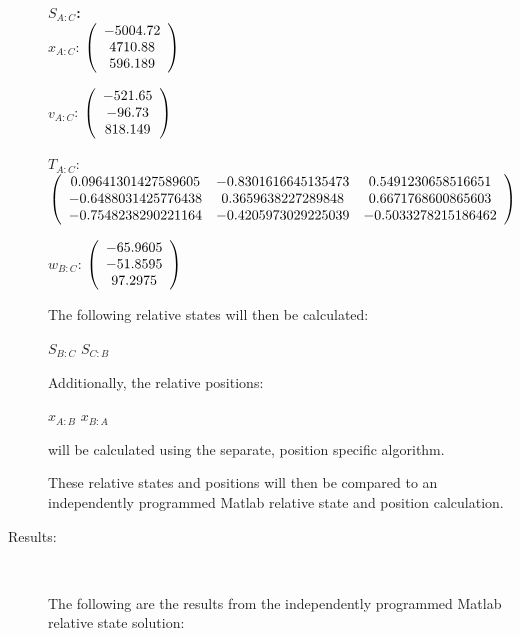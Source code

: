 \begin{description}
\Large{\textbf{$S_{A:C}$:}} \normalsize \\

$x_{A:C}$: $\left( \begin{array} {ccc}  -5004.72 \\    4710.88 \\    596.189
\end{array} \right)\\ \\$

$v_{A:C}$:  $\left( \begin{array} {ccc}  -521.65 \\     -96.73 \\    818.149
\end{array} \right)\\ \\$

$T_{A:C}$: $\left( \begin{array} {ccc}
0.09641301427589605 & -0.8301616645135473 & 0.5491230658516651 \\
-0.6488031425776438 & 0.3659638227289848 & 0.6671768600865603 \\
 -0.7548238290221164 & -0.4205973029225039 & -0.5033278215186462
\end{array} \right)\\ \\$

$w_{B:C}$:  $\left( \begin{array} {ccc} -65.9605 \\   -51.8595 \\    97.2975
\end{array} \right)\\ \\$

The following relative states will then be calculated:

$S_{B:C}$
$S_{C:B}$

Additionally, the relative positions:

$x_{A:B}$
$x_{B:A}$

will be calculated using the separate, position specific algorithm.

These relative states and positions will then be compared to an
independently programmed Matlab relative state and position calculation.

\item[Results:] \ \newline

The following are the results from the independently programmed Matlab relative state
solution:


\end{description}
